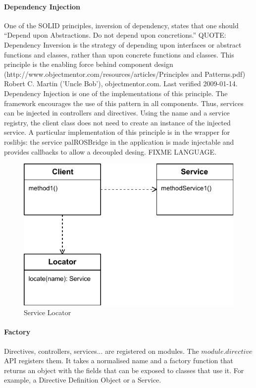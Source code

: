 \paragraph{Dependency Injection} One of the \ac{SOLID} principles, inversion of dependency, states that one should “Depend upon Abstractions. Do not depend upon concretions.”
QUOTE: Dependency Inversion is the strategy of depending upon interfaces or abstract functions and classes, rather than upon concrete functions and classes. This principle is the enabling force behind component design (http://www.objectmentor.com/resources/articles/Principles and Patterns.pdf) Robert C. Martin ('Uncle Bob'), objectmentor.com. Last verified 2009-01-14.
Dependency Injection is one of the implementations of this principle.
The framework encourages the use of this pattern in all components. 
Thus, services can be injected in controllers and directives.
Using the name and a service registry, the client class does not need to create an instance of the injected service. 
A particular implementation of this principle is in the wrapper for roslibjs: the service palROSBridge in the application is made injectable and provides callbacks to allow a decoupled desing. FIXME LANGUAGE.


\begin{figure}[htb]
    \centering
    \includegraphics{figures/design-patterns-servicelocator.pdf}
    \caption{Service Locator}
    \label{fig:Service Locator}
\end{figure}


\paragraph{Factory} Directives, controllers, services... are registered on modules. 
The $module.directive$ \ac{API} registers them. 
It takes a normalised name and a factory function that returns an object with the fields that can be exposed to classes that use it.
For example, a Directive Definition Object or a Service.




